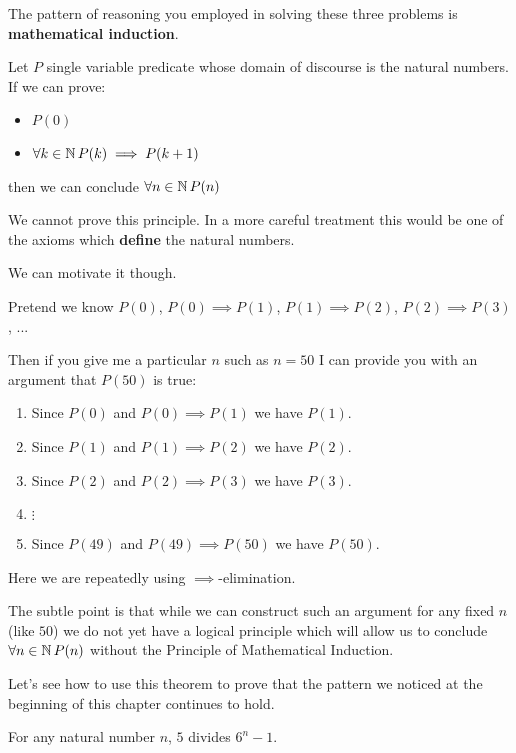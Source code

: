 The pattern of reasoning you employed in solving these three problems is \textbf{mathematical induction}.

\begin{principle}
	Let $P$ single variable predicate whose domain of discourse is the natural numbers.  If we can prove:
	
	\begin{itemize}
			\item $P(0)$
			\item $\forall k \in \mathbb{N}  \, P(k) \implies P(k+1)$
		\end{itemize}
	
	then we can conclude $\forall n \in \mathbb{N} \, P(n)$
	\end{principle}

We cannot prove this principle.  In a more careful treatment this would be one of the axioms which \textbf{define} the natural numbers.

We can motivate it though.

Pretend we know $P(0)$, $P(0) \implies P(1)$, $P(1)\implies P(2)$, $P(2) \implies P(3)$, ...

Then if you give me a particular $n$ such as $n=50$ I can provide you with an argument that $P(50)$ is true: 

\begin{enumerate}
		\item Since $P(0)$ and $P(0) \implies P(1)$ we have $P(1)$.
		\item Since $P(1)$ and $P(1) \implies P(2)$ we have $P(2)$.
		\item Since $P(2)$ and $P(2) \implies P(3)$ we have $P(3)$.
		\item $\vdots$
		\item Since $P(49)$ and $P(49) \implies P(50)$ we have $P(50)$.
	\end{enumerate}

Here we are repeatedly using $\implies$-elimination.

The subtle point is that while we can construct such an argument for any fixed $n$ (like $50$) we do not yet have a logical principle which will allow us to conclude $\forall n \in \mathbb{N} \, P(n)$ without the Principle of Mathematical Induction.

Let's see how to use this theorem to prove that the pattern we noticed at the beginning of this chapter continues to hold.

\begin{theorem}
		For any natural number $n$, $5$  divides $6^n-1$.
	\end{theorem} 

